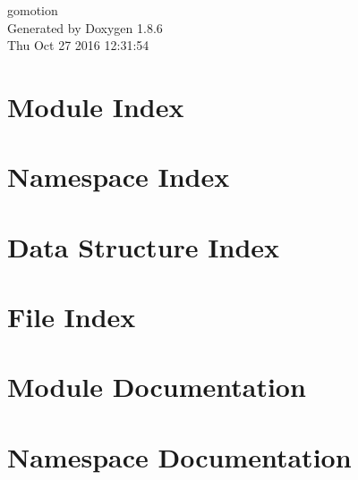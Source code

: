 \documentclass[twoside]{book}
\newcommand{\clearemptydoublepage}{%
  \newpage{\pagestyle{empty}\cleardoublepage}%
}
\begin{document}
\hypersetup{pageanchor=false}
\begin{titlepage}
\vspace*{7cm}
\begin{center}%
{\Large gomotion }\\
\vspace*{1cm}
{\large Generated by Doxygen 1.8.6}\\
\vspace*{0.5cm}
{\small Thu Oct 27 2016 12:31:54}\\
\end{center}
\end{titlepage}
\clearemptydoublepage
\tableofcontents
\clearemptydoublepage
{}
\hypersetup{pageanchor=true}

\chapter{Module Index}

\chapter{Namespace Index}

\chapter{Data Structure Index}

\chapter{File Index}

\chapter{Module Documentation}


\chapter{Namespace Documentation}

\end{document}
